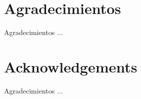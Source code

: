 \chapter{Agradecimientos} %

Agradecimientos ...









\chapter{Acknowledgements} %

Agradecimientos ...

